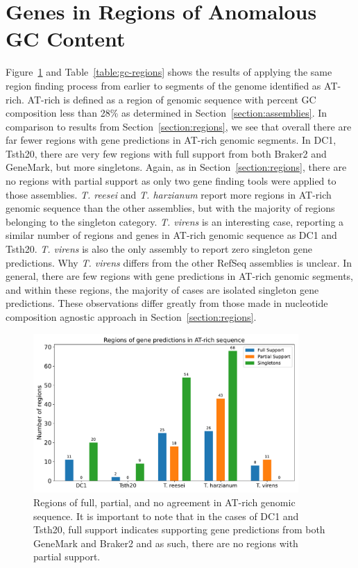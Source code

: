 \section{Genes in Regions of Anomalous GC Content}\label{section:gc-regions}

Figure~\ref{fig:gc-regions} and Table~\ref{table:gc-regions} shows the
results of applying the same region finding process from earlier to
segments of the genome identified as AT-rich. AT-rich is defined as a
region of genomic sequence with percent GC composition less than 28\%
as determined in Section~\ref{section:assemblies}. In comparison to
results from Section~\ref{section:regions}, we see that overall there
are far fewer regions with gene predictions in AT-rich genomic
segments. In DC1, Tsth20, there are very few regions with full support
from both Braker2 and GeneMark, but more singletons. Again, as in
Section~\ref{section:regions}, there are no regions with partial
support as only two gene finding tools were applied to those
assemblies. \textit{T. reesei} and \textit{T. harzianum} report more
regions in AT-rich genomic sequence than the other assemblies, but
with the majority of regions belonging to the singleton
category. \textit{T. virens} is an interesting case, reporting a
similar number of regions and genes in AT-rich genomic sequence as DC1
and Tsth20. \textit{T. virens} is also the only assembly to report
zero singleton gene predictions. Why \textit{T. virens} differs from
the other RefSeq assemblies is unclear. In general, there are few
regions with gene predictions in AT-rich genomic segments, and within
these regions, the majority of cases are isolated singleton gene
predictions. These observations differ greatly from those made in
nucleotide composition agnostic approach in
Section~\ref{section:regions}.

\begin{figure}
  \centering
  \includegraphics[width=0.90\textwidth]{figures/atrich-regions-barplot.pdf}
  \caption[Regions of agreement in AT-rich genomic sequence]{Regions of full, partial, and no agreement in AT-rich genomic sequence. It is important to note that in the cases of DC1 and Tsth20, full support indicates supporting gene predictions from both GeneMark and Braker2 and as such, there are no regions with partial support.}\label{fig:gc-regions}
\end{figure}

